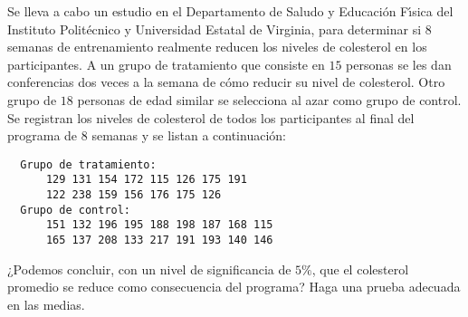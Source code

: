 \begin{enunciado}
 Se lleva a cabo un estudio en el Departamento de Saludo y Educaci\'on
 F\'{\i}sica del Instituto Polit\'ecnico y Universidad Estatal
 de Virginia, para determinar
 si 8 semanas de entrenamiento realmente reducen
 los niveles de colesterol en los participantes.
 A un grupo de tratamiento que consiste en $15$ personas se les dan
 conferencias dos veces a la semana
 de c\'omo reducir su nivel de colesterol.
 Otro grupo de $18$ personas de edad similar se selecciona al azar
 como grupo de control.
 Se registran los niveles de colesterol de todos los participantes
 al final del programa de 8 semanas y se listan a continuaci\'on:
 \begin{verbatim}
  Grupo de tratamiento:
      129 131 154 172 115 126 175 191
      122 238 159 156 176 175 126
  Grupo de control:
      151 132 196 195 188 198 187 168 115
      165 137 208 133 217 191 193 140 146
 \end{verbatim}
 ¿Podemos concluir, con un nivel de significancia de $5\%$,
 que el colesterol promedio se reduce como consecuencia del programa?
 Haga una prueba adecuada en las medias.
\end{enunciado}

